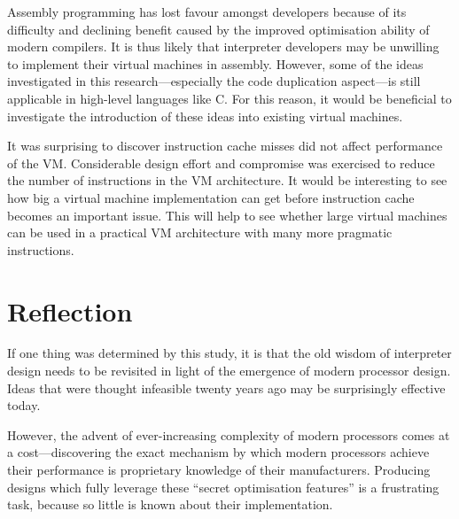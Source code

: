 	Assembly programming has lost favour amongst developers because of its difficulty and declining benefit caused by the improved optimisation ability of modern compilers. It is thus likely that interpreter developers may be unwilling to implement their virtual machines in assembly. However, some of the ideas investigated in this research---especially the code duplication aspect---is still applicable in high-level languages like C. For this reason, it would be beneficial to investigate the introduction of these ideas into existing virtual machines.
	
	It was surprising to discover instruction cache misses did not affect performance of the VM. Considerable design effort and compromise was exercised to reduce the number of instructions in the VM architecture. It would be interesting to see how big a virtual machine implementation can get before instruction cache becomes an important issue. This will help to see whether large virtual machines can be used in a practical VM architecture with many more pragmatic instructions.
	\clearpage
	\section{Reflection}
	If one thing was determined by this study, it is that the old wisdom of interpreter design needs to be revisited in light of the emergence of modern processor design. Ideas that were thought infeasible twenty years ago may be surprisingly effective today.
	
	However, the advent of ever-increasing complexity of modern processors comes at a cost---discovering the exact mechanism by which modern processors achieve their performance is proprietary knowledge of their manufacturers. Producing designs which fully leverage these ``secret optimisation features'' is a frustrating task, because so little is known about their implementation.
	
\bibliographysection

